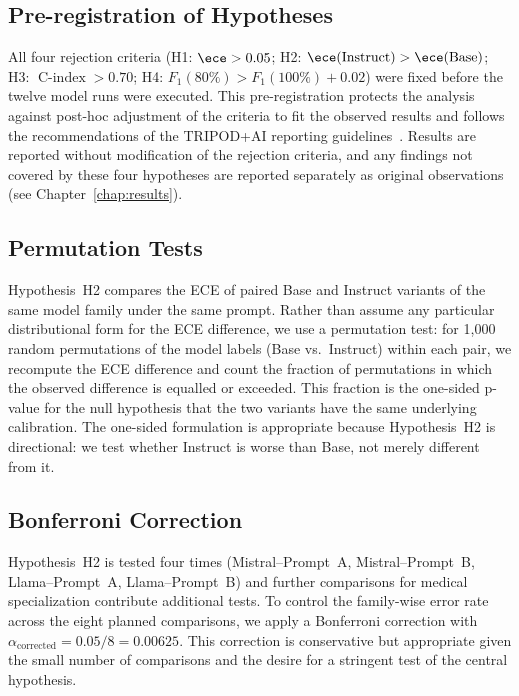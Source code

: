 \subsection{Pre-registration of Hypotheses}
\label{subsec:met-preregistration}

All four rejection criteria (H1: $\ece > 0.05$; H2: 
$\ece(\text{Instruct}) > \ece(\text{Base})$; H3: 
$\operatorname{C-index} > 0.70$; H4: $F_1(80\%) > F_1(100\%) + 0.02$) 
were fixed before the twelve model runs were executed. This 
pre-registration protects the analysis against post-hoc adjustment of 
the criteria to fit the observed results and follows the recommendations 
of the TRIPOD+AI reporting guidelines~\cite{collins2024tripod}. Results 
are reported without modification of the rejection criteria, and any 
findings not covered by these four hypotheses are reported separately as 
original observations (see Chapter~\ref{chap:results}).

\subsection{Permutation Tests}
\label{subsec:met-permutation}

Hypothesis~H2 compares the ECE of paired Base and Instruct variants of 
the same model family under the same prompt. Rather than assume any 
particular distributional form for the ECE difference, we use a 
permutation test: for 1{,}000 random permutations of the model labels 
(Base vs.\ Instruct) within each pair, we recompute the ECE difference 
and count the fraction of permutations in which the observed difference 
is equalled or exceeded. This fraction is the one-sided p-value for the 
null hypothesis that the two variants have the same underlying 
calibration. The one-sided formulation is appropriate because 
Hypothesis~H2 is directional: we test whether Instruct is worse than 
Base, not merely different from it.

\subsection{Bonferroni Correction}
\label{subsec:met-bonferroni}

Hypothesis~H2 is tested four times (Mistral--Prompt~A, Mistral--Prompt~B, 
Llama--Prompt~A, Llama--Prompt~B) and further comparisons for medical 
specialization contribute additional tests. To control the family-wise 
error rate across the eight planned comparisons, we apply a Bonferroni 
correction with $\alpha_{\text{corrected}} = 0.05 / 8 = 0.00625$. This 
correction is conservative but appropriate given the small number of 
comparisons and the desire for a stringent test of the central 
hypothesis.

